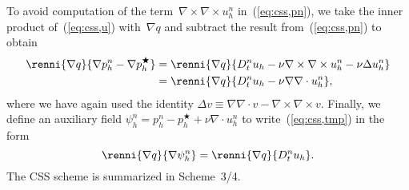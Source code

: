 To avoid computation of the term~$\nabla \times \nabla \times u_h^n$
in~(\ref{eq:css,pn}), we take the inner product of~(\ref{eq:css,u})
with~$\nabla q$ and subtract the result from~(\ref{eq:css,pn}) to
obtain
\begin{equation}\label{eq:css,tmp}
 \begin{split}
   \renni{\nabla q}{\nabla p_h^n - \nabla p_h^{\bigstar}}
   &=
   \renni{\nabla q}{D_t^n u_h
   - \nu \nabla \times \nabla \times u_h^n - \nu \Delta u_h^n} \\
   &=
   \renni{\nabla q}{D_t^n u_h - \nu \nabla \nabla \cdot u_h^n},
 \end{split}
\end{equation}
where we have again used the identity $\Delta v \equiv \nabla \nabla
\cdot v - \nabla \times \nabla \times v$. Finally, we define an
auxiliary field $\psi_h^n = p_h^n - p_h^{\bigstar} + \nu \nabla
\cdot u_h^n$ to write~(\ref{eq:css,tmp}) in the form
\begin{equation}
  \renni{\nabla q}{\nabla \psi_h^n}
  = \renni{\nabla q}{D_t^n u_h}.
\end{equation}
The CSS scheme is summarized in Scheme~3/4.


\renewcommand{\scheme}[3]{%
\begin{figure}[!p]
  \vspace*{-12pt}
  \center
    \small
    \begin{tabular}{l}
      \toprule
      \textbf{Scheme #1:} #2 \\
      \midrule
  \begin{minipage}{.93\textwidth}
        \vspace{0.1cm}
        \begin{enumerate}
          #3
        \end{enumerate}
        \vspace{0.1cm}
      \end{minipage} \\
      \bottomrule
    \end{tabular}
    \normalsize
\end{figure}}


